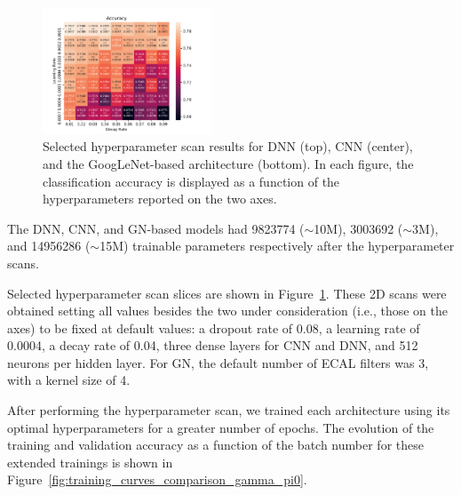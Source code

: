 \begin{figure}[htbp]
\includegraphics[width=0.45\textwidth]{Images/Calo/GN_lr_dr.pdf}
\caption{Selected hyperparameter scan results for DNN (top), CNN (center), and the GoogLeNet-based architecture (bottom). In each figure, the classification accuracy is displayed as a function of the hyperparameters reported on the two axes.}
\label{fig:scan_hyperparameter}
\end{figure}

The DNN, CNN, and GN-based models had 9823774 ($\sim$10M), 3003692 ($\sim$3M), and 14956286 ($\sim$15M) trainable parameters respectively after the hyperparameter scans.

Selected hyperparameter scan slices are shown in Figure~\ref{fig:scan_hyperparameter}. 
These 2D scans were obtained setting all values besides the two under consideration (i.e., those on the axes) to be fixed at default values: a dropout rate of 0.08, a learning rate of 0.0004, a decay rate of 0.04, three dense layers for CNN and DNN, and 512 neurons per hidden layer. For GN, the default number of ECAL filters was 3, with a kernel size of 4.

After performing the hyperparameter scan, we trained each architecture using its optimal hyperparameters for a greater number of epochs. The evolution of the training and validation accuracy as a function of the batch number for these extended trainings is shown in Figure~\ref{fig:training_curves_comparison_gamma_pi0}.

